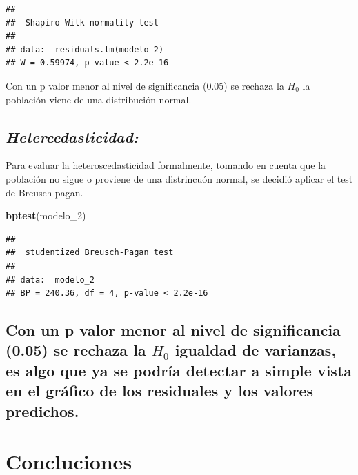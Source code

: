\documentclass[
  12pt,
]{article}
\newenvironment{Shaded}{\begin{snugshade}}{\end{snugshade}}
\newcommand{\FunctionTok}[1]{\textcolor[rgb]{0.13,0.29,0.53}{\textbf{#1}}}
\newcommand{\NormalTok}[1]{#1}
\begin{document}
\begin{verbatim}
## 
##  Shapiro-Wilk normality test
## 
## data:  residuals.lm(modelo_2)
## W = 0.59974, p-value < 2.2e-16
\end{verbatim}

Con un p valor menor al nivel de significancia (0.05) se rechaza la
\(H_0\) la población viene de una distribución normal.

\subsection{\texorpdfstring{\emph{Hetercedasticidad:}}{Hetercedasticidad:}}\label{hetercedasticidad}

Para evaluar la heteroscedasticidad formalmente, tomando en cuenta que
la población no sigue o proviene de una distrincuón normal, se decidió
aplicar el test de Breusch-pagan.

\begin{Shaded}
\begin{Highlighting}[]
\FunctionTok{bptest}\NormalTok{(modelo\_2)}
\end{Highlighting}
\end{Shaded}

\begin{verbatim}
## 
##  studentized Breusch-Pagan test
## 
## data:  modelo_2
## BP = 240.36, df = 4, p-value < 2.2e-16
\end{verbatim}

\subsection{\texorpdfstring{Con un p valor menor al nivel de
significancia (0.05) se rechaza la \(H_0\) igualdad de varianzas, es
algo que ya se podría detectar a simple vista en el gráfico de los
residuales y los valores
predichos.}{Con un p valor menor al nivel de significancia (0.05) se rechaza la H\_0 igualdad de varianzas, es algo que ya se podría detectar a simple vista en el gráfico de los residuales y los valores predichos.}}\label{con-un-p-valor-menor-al-nivel-de-significancia-0.05-se-rechaza-la-h_0-igualdad-de-varianzas-es-algo-que-ya-se-podruxeda-detectar-a-simple-vista-en-el-gruxe1fico-de-los-residuales-y-los-valores-predichos.}

\section{Concluciones}\label{concluciones}
\end{document}
